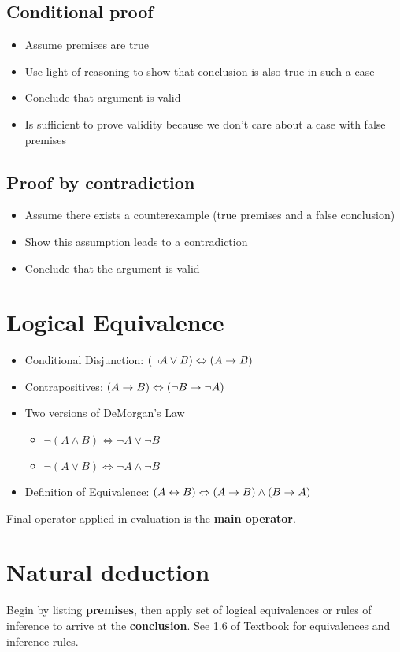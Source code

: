 \subsection{Conditional proof}

\begin{itemize}
    \item Assume premises are true
    \item Use light of reasoning to show that conclusion is also true in such a case
    \item Conclude that argument is valid
    \item Is sufficient to prove validity because we don't care about a case with false premises
\end{itemize}

\subsection{Proof by contradiction}

\begin{itemize}
    \item Assume there exists a counterexample (true premises and a false conclusion)
    \item Show this assumption leads to a contradiction
    \item Conclude that the argument is valid
\end{itemize}

\section{Logical Equivalence}

\begin{itemize}
    \item Conditional Disjunction: $(\lnot A\lor B)\Leftrightarrow (A\rightarrow B)$
    \item Contrapositives: $(A\rightarrow B)\Leftrightarrow (\lnot B\rightarrow \lnot A)$
    \item Two versions of DeMorgan's Law
    \begin{itemize}
        \item $\lnot(A\land B)\Leftrightarrow\lnot A\lor \lnot B$
        \item $\lnot(A\lor B)\Leftrightarrow\lnot A\land \lnot B$
    \end{itemize}
    \item Definition of Equivalence: $(A\leftrightarrow B)\Leftrightarrow (A\rightarrow B)\land (B\rightarrow A)$
\end{itemize}

Final operator applied in evaluation is the \textbf{main operator}.

\section{Natural deduction}

Begin by listing \textbf{premises}, then apply set of logical equivalences
or rules of inference to arrive at the \textbf{conclusion}. See 1.6 of Textbook
for equivalences and inference rules.